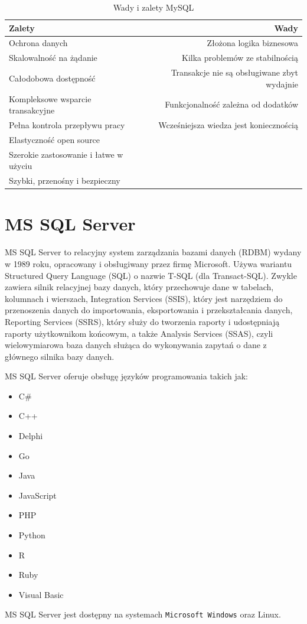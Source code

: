 \documentclass[oneside,polski,logo,indent]{amuthesis}
\begin{document}
\begin{enumerate}
\begin{enumerate}
\begin{table}[h!]
\caption{Wady i zalety MySQL}
\label{tabela-MySQL}
\centering
\begin{adjustbox}{width=1\textwidth}
\small
\begin{tabular}{|l|r|}
\toprule
Zalety & Wady\\
\midrule
Ochrona danych & Złożona logika biznesowa\\
Skalowalność na żądanie & Kilka problemów ze stabilnością\\
Całodobowa dostępność & Transakcje nie są obsługiwane zbyt wydajnie\\
Kompleksowe wsparcie transakcyjne & Funkcjonalność zależna od dodatków\\
Pełna kontrola przepływu pracy & Wcześniejsza wiedza jest koniecznością\\
Elastyczność open source &\\
Szerokie zastosowanie i łatwe w użyciu &\\
Szybki, przenośny i bezpieczny &\\
\bottomrule
\end{tabular}
\end{adjustbox}
\end{table}
\section{MS SQL Server}
MS SQL Server to relacyjny system zarządzania bazami danych (RDBM) wydany w 1989 roku, opracowany i obsługiwany przez firmę Microsoft. Używa wariantu Structured Query Language (SQL) o nazwie T-SQL (dla Transact-SQL). Zwykle zawiera silnik relacyjnej bazy danych, który przechowuje dane w tabelach, kolumnach i wierszach, Integration Services (SSIS), który jest narzędziem do przenoszenia danych do importowania, eksportowania i przekształcania danych, Reporting Services (SSRS), który służy do tworzenia raporty i udostępniają raporty użytkownikom końcowym, a także Analysis Services (SSAS), czyli wielowymiarowa baza danych służąca do wykonywania zapytań o dane z głównego silnika bazy danych. 

MS SQL Server oferuje obsługę języków programowania takich jak: 
\begin{itemize}
\item C\#
\item C++ 
\item Delphi 
\item Go 
\item Java 
\item JavaScript 
\item PHP 
\item Python 
\item R 
\item Ruby 
\item Visual Basic 
\end{itemize}
MS SQL Server jest dostępny na systemach \texttt{Microsoft Windows} oraz Linux.


\end{enumerate}
\end{enumerate}
\end{document}
